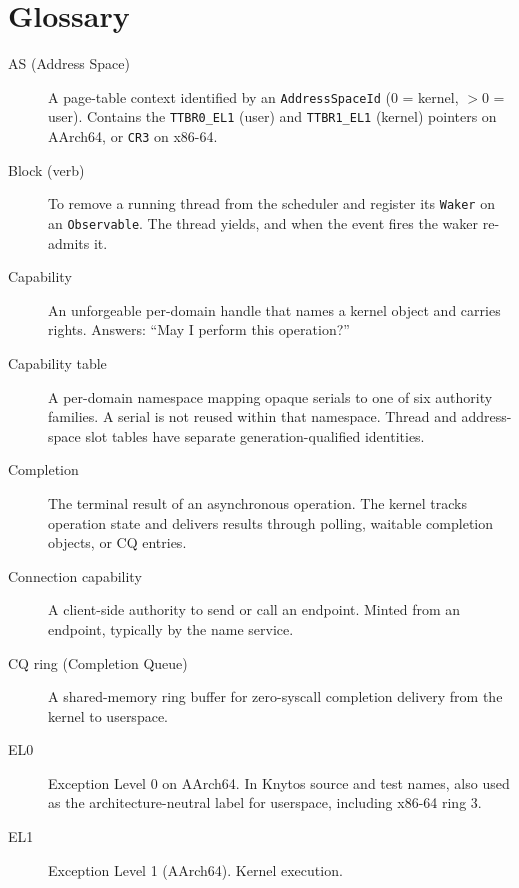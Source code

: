 \chapter{Glossary}

\begin{description}
    \item[AS (Address Space)] A page-table context identified by an
        \texttt{AddressSpaceId} (0 = kernel, $>$0 = user). Contains the
        \texttt{TTBR0\_EL1} (user) and \texttt{TTBR1\_EL1} (kernel) pointers
        on AArch64, or \texttt{CR3} on x86-64.

    \item[Block (verb)] To remove a running thread from the scheduler and
        register its \texttt{Waker} on an \texttt{Observable}. The thread
        yields, and when the event fires the waker re-admits it.

    \item[Capability] An unforgeable per-domain handle that names a kernel
        object and carries rights. Answers: ``May I perform this operation?''

    \item[Capability table] A per-domain namespace mapping opaque serials to
        one of six authority families. A serial is not reused within that
        namespace. Thread and address-space slot tables have separate
        generation-qualified identities.

    \item[Completion] The terminal result of an asynchronous operation. The
        kernel tracks operation state and delivers results through polling,
        waitable completion objects, or CQ entries.

    \item[Connection capability] A client-side authority to send or call an
        endpoint. Minted from an endpoint, typically by the name service.

    \item[CQ ring (Completion Queue)] A shared-memory ring buffer for
        zero-syscall completion delivery from the kernel to userspace.

    \item[EL0] Exception Level 0 on AArch64. In Knytos source and test
        names, also used as the architecture-neutral label for userspace,
        including x86-64 ring 3.

    \item[EL1] Exception Level 1 (AArch64). Kernel execution.


\end{description}
